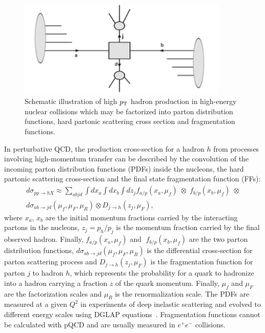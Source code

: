 \begin{figure}[!ht]
  \centering
  \includegraphics[width=10cm]{FigCap1/Scattering.png}
  \caption{Schematic illustration of high $p_{\rm T}$ hadron production in high-energy nuclear collisions which may be factorized into parton distribution functions, hard partonic scattering cross section and fragmentation functions.}
  \label{fig:Scattering}
\end{figure}

In perturbative QCD, the production cross-section for a hadron $h$ from processes involving high-momentum transfer can be described by the convolution of the incoming parton distribution functions (PDFs) inside the nucleons, the hard partonic scattering cross-section and the final state fragmentation function (FFs):
\begin{equation}
\label{eq:QCDhardProduction}
\begin{split}
d\sigma_{pp\rightarrow hX} \approx \sum_{abjd}\int dx_a \int dx_b \int dz_j f_{a/p} (x_a, \mu_f) \; \otimes \;f_{b/p} (x_b, \mu_f) \;\otimes \\
d\sigma_{ab \rightarrow jd} (\mu_f,\mu_F,\mu_R) \otimes D_{j\rightarrow h} (z_j,\mu_F), 
\end{split}
\end{equation}
where $x_a$, $x_b$ are the initial momentum fractions carried by the interacting partons in the nucleons, $z_j = p_h/p_j$ is the momentum fraction carried by the final observed hadron. Finally, $f_{a/p} (x_a, \mu_f)$ and $\;f_{b/p} (x_b, \mu_f) $ are the two parton distribution functions, $d\sigma_{ab \rightarrow jd} (\mu_f,\mu_F,\mu_R) $ is the differential cross-section for parton scattering process and $D_{j\rightarrow h} (z_j,\mu_F)$ is the fragmentation function for parton $j$ to hadron $h$, which represents the probability for a quark to hadronize into a hadron carrying a fraction $z$ of the quark momentum. Finally, $\mu_f$ and $\mu_F$ are the factorization scales and $\mu_R$ is the renormalization scale. The PDFs are measured at a given $Q^2$ in experiments of deep inelastic scattering and evolved to different energy scales using DGLAP equations~\cite{Altarelli:1977zs}. Fragmentation functions cannot be calculated with pQCD and are usually measured in $e^+e^-$ collisions.\\



